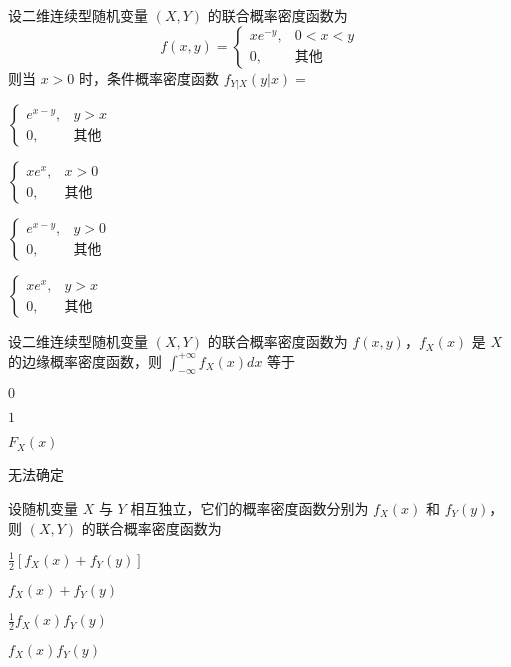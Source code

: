 \documentclass{exam-zh}
\begin{document}
\begin{question}
  设二维连续型随机变量 $(X,Y)$ 的联合概率密度函数为  
  $$f(x,y) = 
  \begin{cases} 
  xe^{-y}, & 0 < x < y \\ 
  0, & \text{其他} 
  \end{cases}$$ 
  则当 $x > 0$ 时，条件概率密度函数  
  $f_{Y|X}(y|x) = $ \paren[A]
  \begin{choices}
    \item 
    $
    \begin{cases} 
    e^{x-y}, & y > x \\ 
    0, & \text{其他} 
    \end{cases}$
    
    \item 
    $
    \begin{cases} 
    xe^x, & x > 0 \\ 
    0, & \text{其他} 
    \end{cases}$
    
    \item 
    $
    \begin{cases} 
    e^{x-y}, & y > 0 \\ 
    0, & \text{其他} 
    \end{cases}$
    
    \item 
    $
    \begin{cases} 
    xe^x, & y > x \\ 
    0, & \text{其他} 
    \end{cases}$
  \end{choices}
\end{question}

\begin{question}
  设二维连续型随机变量 $(X,Y)$ 的联合概率密度函数为 $f(x,y)$，$f_X(x)$ 是 $X$ 的边缘概率密度函数，则  
  $\int_{-\infty}^{+\infty} f_X(x) dx$ 等于 \paren[B]
  \begin{choices}
    \item $0$  
    \item $1$  
    \item $F_X(x)$  
    \item 无法确定  
  \end{choices}
\end{question}

\begin{question}
  设随机变量 $X$ 与 $Y$ 相互独立，它们的概率密度函数分别为 $f_X(x)$ 和 $f_Y(y)$，则 $(X, Y)$ 的联合概率密度函数为 \paren[D]
  \begin{choices}
    \item $\frac{1}{2}[f_X(x) + f_Y(y)]$  
    \item $f_X(x) + f_Y(y)$  
    \item $\frac{1}{2}f_X(x)f_Y(y)$  
    \item $f_X(x)f_Y(y)$  
  \end{choices}
\end{question}
\end{document}
